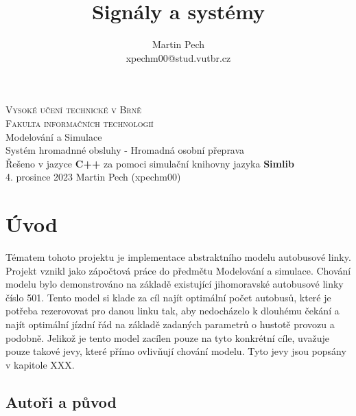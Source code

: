 \documentclass[12pt,a4paper]{article}
\title{Signály a systémy}
\author{Martin Pech\\xpechm00@stud.vutbr.cz}
\begin{document}
	\begin{titlepage}
		\begin{center}
			\Huge
			\textsc{Vysoké učení technické v Brně\\ Fakulta informačních technologií} \\[70mm]
			\LARGE
			Modelování a Simulace\\
			Systém hromadnné obsluhy - Hromadná osobní přeprava\\
			
			\Large Řešeno v jazyce \textbf{C++} za pomoci simulační knihovny jazyka \textbf{Simlib}\\[130mm]
			{\Large 4. prosince 2023 \hspace{108mm}Martin Pech (xpechm00)}
		\end{center}
	\end{titlepage}
	
	\section{Úvod}
	Tématem tohoto projektu je implementace abstraktního modelu autobusové linky. Projekt vznikl jako zápočtová práce do předmětu Modelování a simulace. Chování modelu bylo demonstrováno na základě existující jihomoravské autobusové linky číslo 501. Tento model si klade za cíl najít optimální počet autobusů, které je potřeba rezerovovat pro danou linku tak, aby nedocházelo k dlouhému čekání a najít optimální jízdní řád na základě zadaných parametrů o hustotě provozu a podobně. Jelikož je tento model zacílen pouze na tyto konkrétní cíle, uvažuje pouze takové jevy, které přímo ovlivňují chování modelu. Tyto jevy jsou popsány v kapitole XXX.
	
	\subsection{Autoři a původ }
\end{document}
